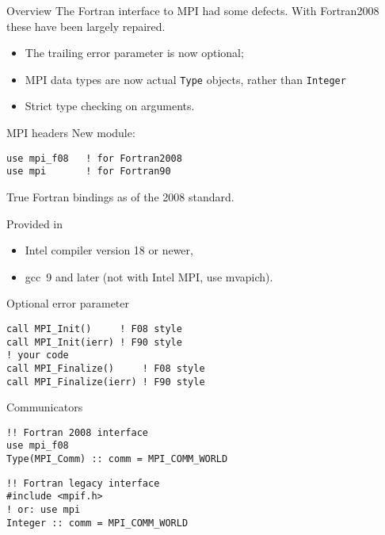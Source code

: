 
\lstset{language=Fortran}
\begin{numberedframe}{Overview}
  The Fortran interface to MPI had some defects.
  With Fortran2008 these have been largely repaired.
  \begin{itemize}
  \item The trailing error parameter is now optional;
  \item MPI data types are now actual \lstinline{Type} objects,
    rather than \lstinline{Integer}
  \item Strict type checking on arguments.
  \end{itemize}
\end{numberedframe}

\begin{numberedframe}{MPI headers}
\label{sl:mpi-header}
New module:
\begin{verbatim}
use mpi_f08   ! for Fortran2008
use mpi       ! for Fortran90
\end{verbatim}
True Fortran bindings as of the 2008 standard.
\begin{tacc}
  Provided in
  \begin{itemize}
  \item
    Intel compiler version 18 or newer,
  \item 
    gcc~9 and later (not with Intel MPI, use mvapich).
  \end{itemize}
\end{tacc}
\end{numberedframe}

\begin{numberedframe}{Optional error parameter}
\lstset{language=Fortran}
\begin{lstlisting}
call MPI_Init()     ! F08 style
call MPI_Init(ierr) ! F90 style
! your code
call MPI_Finalize()     ! F08 style
call MPI_Finalize(ierr) ! F90 style
\end{lstlisting}
\end{numberedframe}

\begin{numberedframe}{Communicators}
\begin{lstlisting}
!! Fortran 2008 interface
use mpi_f08
Type(MPI_Comm) :: comm = MPI_COMM_WORLD
\end{lstlisting}
\begin{lstlisting}
!! Fortran legacy interface
#include <mpif.h>
! or: use mpi
Integer :: comm = MPI_COMM_WORLD
\end{lstlisting}
\end{numberedframe}

